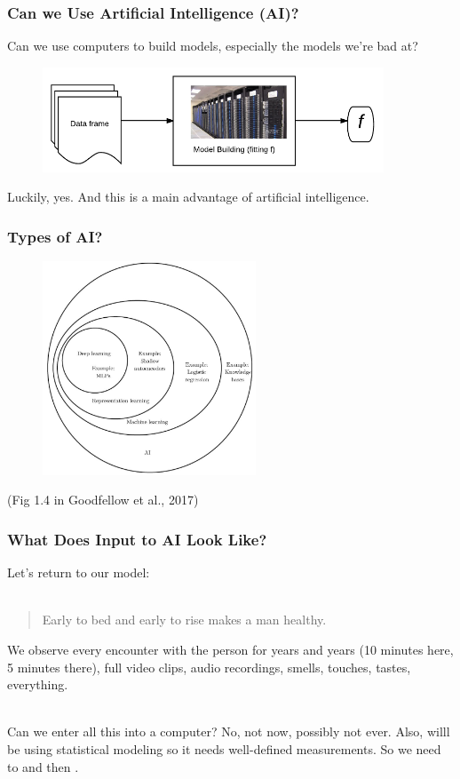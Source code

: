 \documentclass[slides]{beamer} %
\begin{document}
\begin{frame}\frametitle{Can we Use Artificial Intelligence (AI)?}

Can we use computers to build models, especially the models we're bad at?  \pause 

\begin{figure}
\centering
\includegraphics[width=4in]{machine_learning}
\end{figure}
	
Luckily, yes. And this is a main advantage of artificial intelligence.

\end{frame}

\begin{frame}\frametitle{Types of AI?}

\begin{figure}
\centering
\includegraphics[width=2.5in]{fig14.jpg}
\end{figure}

(Fig 1.4 in Goodfellow et al., 2017)

\end{frame}

\begin{frame}\frametitle{What Does Input to AI Look Like?}

Let's return to our model:\\~\\

\begin{quotation}
Early to bed and early to rise makes a man healthy.
\end{quotation}

We observe every encounter with the person for years and years (10 minutes here, 5 minutes there), full video clips, audio recordings, smells, touches, tastes, everything.\\~\\ \pause 

Can we enter all this into a computer? No, not now, possibly not ever. Also, willl be using statistical modeling so it needs well-defined measurements. So we need to  and then .

	
\end{frame}
\end{document}
